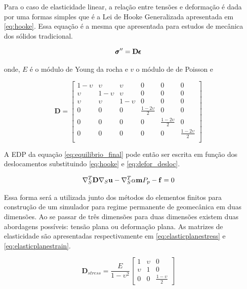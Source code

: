 Para o caso de elasticidade linear, a relação entre tensões e deformação é dada por uma formas simples  que é a Lei de Hooke Generalizada apresentada em \eqref{eq:hooke}. Essa equação é a mesma que apresentada para estudos de mecânica dos sólidos tradicional.

\begin{equation}{
\label{eq:hooke}
\pmb{\sigma}^{\prime\prime}= \mathbf{D} \pmb{\epsilon}}
\end{equation}

onde, $E$ é o módulo de Young da rocha e $v$ o módulo de de Poisson e

\begin{equation}
    \mathbf{D} = \begin{bmatrix}
 1-\upsilon & \upsilon    &  \upsilon & 0 & 0 & 0  \\
 \upsilon   &  1-\upsilon &  \upsilon & 0 & 0 & 0  \\
  \upsilon & \upsilon   &  1-\upsilon &  0 & 0 & 0 \\
 0& 0& 0 & \frac{1-2\upsilon}{2} & 0 & 0    \\
 0& 0& 0 & 0 &\frac{1-2\upsilon}{2} & 0     \\
 0& 0& 0 & 0 & 0 &  \frac{1-2\upsilon}{2}     \\
 
\end{bmatrix}
\end{equation}



A EDP da equação \eqref{eq:equilibrio_final} pode então ser escrita em função dos deslocamentos substituindo \eqref{eq:hooke} e \eqref{eq:defor_desloc}.

\begin{equation}
\label{eq:edp_geomec}
\nabla_S^T \mathbf{D} \nabla_S \mathbf{u} - \nabla_S^T\alpha \mathbf{m} P_p - \mathbf{f} = 0
\end{equation}

 Essa forma será a utilizada junto dos métodos do elementos finitos para construção de um simulador para regime permanente de geomecânica em duas dimensões. Ao se passar de três dimensões para duas dimensões existem duas abordagens possíveis: tensão plana ou deformação plana. As matrizes de elasticidade são apresentadas respectivamente em \eqref{eq:elasticplanestress} e \eqref{eq:elasticplanestrain}.

\begin{equation} \label{eq:elasticplanestress}
\mathbf{D}_{stress} = \frac{E}{1-\upsilon^2}
\begin{bmatrix}
1  & \upsilon & 0 \\
\upsilon & 1 &  0 \\
0 & 0 & \frac{1-\upsilon}{2}
\end{bmatrix}
\end{equation}

